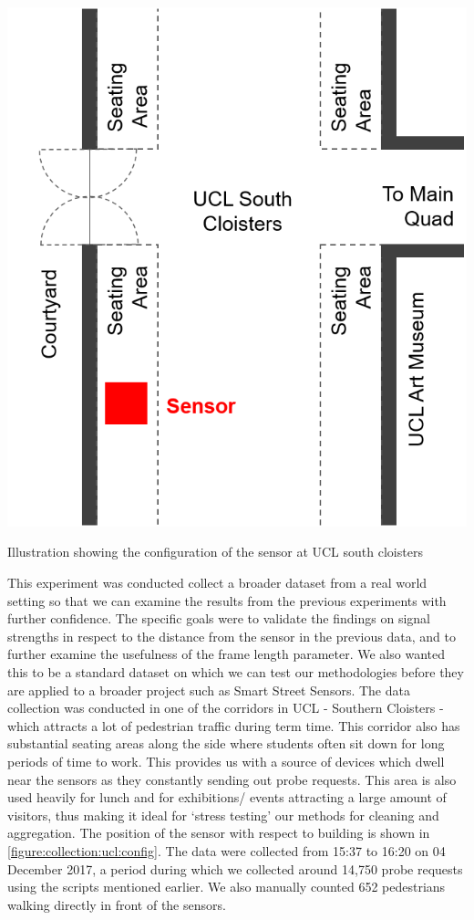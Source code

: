 \begin{marginfigure}[4.5cm]
  \forcerectofloat
  \includegraphics[trim={5 5 5 5},clip]{images/south-cloisters.png}
  \caption{Illustration showing the configuration of the sensor at UCL south cloisters}
  \label{figure:collection:ucl:config}
\end{marginfigure}

This experiment was conducted collect a broader dataset from a real world setting so that we can examine the results from the previous experiments with further confidence.
The specific goals were to validate the findings on signal strengths in respect to the distance from the sensor in the previous data, and to further examine the usefulness of the frame length parameter.
We also wanted this to be a standard dataset on which we can test our methodologies before they are applied to a broader project such as Smart Street Sensors.
The data collection was conducted in one of the corridors in UCL - Southern Cloisters - which attracts a lot of pedestrian traffic during term time.
This corridor also has substantial seating areas along the side where students often sit down for long periods of time to work.
This provides us with a source of devices which dwell near the sensors as they constantly sending out probe requests.
This area is also used heavily for lunch and for exhibitions/ events attracting  a large amount of visitors, thus making it ideal for `stress testing' our methods for cleaning and aggregation.
The position of the sensor with respect to building is shown in \ref{figure:collection:ucl:config}.
The data were collected from 15:37 to 16:20 on 04 December 2017, a period during which we collected around 14,750 probe requests using the scripts mentioned earlier. We also manually counted 652 pedestrians walking directly in front of the sensors.

